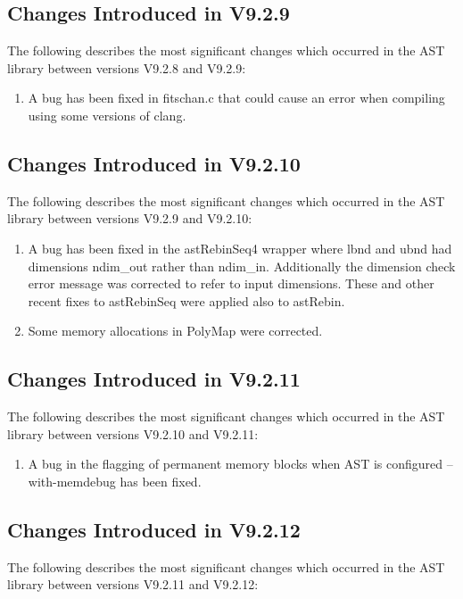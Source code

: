 \documentclass[twoside,11pt]{starlink}
\begin{document}
\subsection{Changes Introduced in V9.2.9}
The following describes the most significant changes which
occurred in the AST library between versions V9.2.8 and V9.2.9:

\begin{enumerate}

\item A bug has been fixed in fitschan.c that could cause an error when
compiling using some versions of clang.

\end{enumerate}


\subsection{Changes Introduced in V9.2.10}
The following describes the most significant changes which
occurred in the AST library between versions V9.2.9 and V9.2.10:

\begin{enumerate}

\item  A bug has been fixed in the astRebinSeq4 wrapper where lbnd and ubnd
had dimensions ndim\_out rather than ndim\_in. Additionally the dimension
check error message was corrected to refer to input dimensions. These
and other recent fixes to astRebinSeq were applied also to astRebin.

\item Some memory allocations in PolyMap were corrected.

\end{enumerate}


\subsection{Changes Introduced in V9.2.11}
The following describes the most significant changes which
occurred in the AST library between versions V9.2.10 and V9.2.11:

\begin{enumerate}

\item  A bug in the flagging of permanent memory blocks when AST is configured
--with-memdebug has been fixed.
\end{enumerate}


\subsection{Changes Introduced in V9.2.12}
The following describes the most significant changes which
occurred in the AST library between versions V9.2.11 and V9.2.12:
\end{document}
